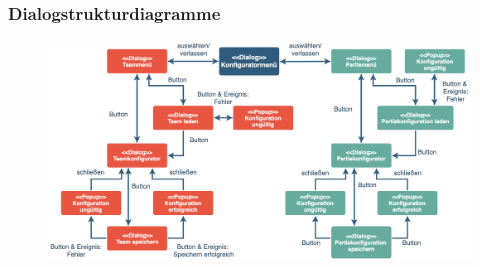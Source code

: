 \subsubsection{Dialogstrukturdiagramme}    
\begin{figure}[H]
    \centering
    \includegraphics[width=\textwidth]{images/dialogstruktur_konfigurator}
\end{figure}



